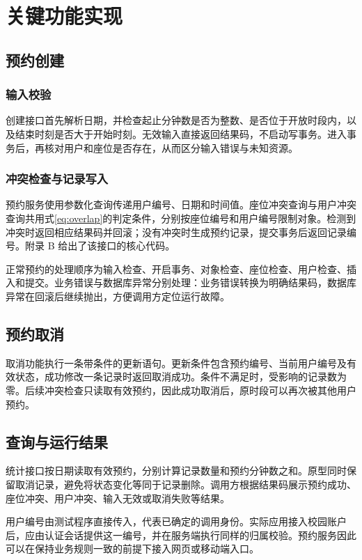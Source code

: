\chapter{关键功能实现}
\section{预约创建}
\subsection{输入校验}
创建接口首先解析日期，并检查起止分钟数是否为整数、是否位于开放时段内，以及结束时刻是否大于开始时刻。无效输入直接返回结果码，不启动写事务。进入事务后，再核对用户和座位是否存在，从而区分输入错误与未知资源。

\subsection{冲突检查与记录写入}
预约服务使用参数化查询传递用户编号、日期和时间值。座位冲突查询与用户冲突查询共用式\eqref{eq:overlap}的判定条件，分别按座位编号和用户编号限制对象。检测到冲突时返回相应结果码并回滚；没有冲突时生成预约记录，提交事务后返回记录编号。附录 B 给出了该接口的核心代码。

正常预约的处理顺序为输入检查、开启事务、对象检查、座位检查、用户检查、插入和提交。业务错误与数据库异常分别处理：业务错误转换为明确结果码，数据库异常在回滚后继续抛出，方便调用方定位运行故障。

\section{预约取消}
取消功能执行一条带条件的更新语句。更新条件包含预约编号、当前用户编号及有效状态，成功修改一条记录时返回取消成功。条件不满足时，受影响的记录数为零。后续冲突检查只读取有效预约，因此成功取消后，原时段可以再次被其他用户预约。

\section{查询与运行结果}
统计接口按日期读取有效预约，分别计算记录数量和预约分钟数之和。原型同时保留取消记录，避免将状态变化等同于记录删除。调用方根据结果码展示预约成功、座位冲突、用户冲突、输入无效或取消失败等结果。

用户编号由测试程序直接传入，代表已确定的调用身份。实际应用接入校园账户后，应由认证会话提供这一编号，并在服务端执行同样的归属校验。预约服务因此可以在保持业务规则一致的前提下接入网页或移动端入口。
